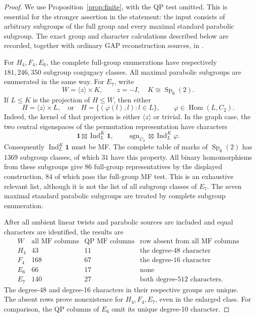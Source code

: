 \documentclass[11pt]{article}
\numberwithin{equation}{section}
\theoremstyle{definition}
\DeclareMathOperator{\Ind}{Ind}
\DeclareMathOperator{\sgn}{sgn}
\DeclareMathOperator{\Hom}{Hom}
\DeclareMathOperator{\Sp}{Sp}
\newcommand{\one}{\mathbf 1}
\begin{document}
\begin{proof}
We use Proposition~\ref{prop:finite}, with the QP test omitted.
This is essential for the stronger assertion in the statement: the input consists of arbitrary subgroups of the full group and every maximal standard parabolic subgroup.
The exact group and character calculations described below are recorded, together with ordinary GAP reconstruction sources, in \cite{ZhangData}.

For \(H_4,F_4,E_6\), the complete full-group enumerations have respectively \(181,246,350\) subgroup conjugacy classes.
All maximal parabolic subgroups are enumerated in the same way.
For \(E_7\), write
\[
 W=\langle z\rangle\times K,\qquad z=-I,\quad K\cong\Sp_6(2).
\]
If \(L\leq K\) is the projection of \(H\leq W\), then either
\[
 H=\langle z\rangle\times L,
 \quad\text{or}\quad
 H=\{(\varphi(l),l):l\in L\},\qquad\varphi\in\Hom(L,C_2).
\]
Indeed, the kernel of that projection is either \(\langle z\rangle\) or trivial.
In the graph case, the two central eigenspaces of the permutation representation have characters
\[
 \one\boxtimes\Ind_L^K\one,
 \qquad\sgn_{C_2}\boxtimes\Ind_L^K\varphi.
\]
Consequently \(\Ind_L^K\one\) must be MF.
The complete table of marks of \(\Sp_6(2)\) has \(1369\) subgroup classes, of which \(31\) have this property.
All binary homomorphisms from these subgroups give \(86\) full-group representatives by the displayed construction, \(84\) of which pass the full-group MF test.
This is an exhaustive relevant list, although it is not the list of all subgroup classes of \(E_7\).
The seven maximal standard parabolic subgroups are treated by complete subgroup enumeration.

After all ambient linear twists and parabolic sources are included and equal characters are identified, the results are
\[
\begin{array}{c|r|r|l}
 W&\text{all MF columns}&\text{QP MF columns}&
   \text{row absent from all MF columns}\\ \hline
 H_4&43&11&\text{the degree-48 character}\\
 F_4&168&67&\text{the degree-16 character}\\
 E_6&66&17&\text{none}\\
 E_7&140&27&\text{both degree-512 characters}.
\end{array}
\]
The degree-48 and degree-16 characters in their respective groups are unique.
The absent rows prove nonexistence for \(H_4,F_4,E_7\), even in the enlarged class.
For comparison, the QP columns of \(E_6\) omit its unique degree-10 character.


\end{proof}
\end{document}
